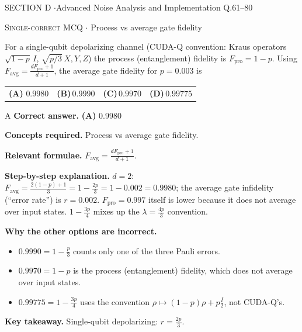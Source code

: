 \documentclass[11pt,a4paper]{article}
\newcommand{\optlabel}[1]{\textbf{(#1)}}
\newcommand{\correctlabel}[1]{\textcolor{okgreen}{\textbf{(#1)}\,\ding{51}}}
\newenvironment{qitem}[1]{\begin{list}{}{\setlength{\leftmargin}{3.3em}\setlength{\labelwidth}{3.1em}%
  \setlength{\labelsep}{0.2em}\setlength{\topsep}{3pt}\setlength{\parsep}{3pt}}\item[\textbf{Q.#1}\hfill]}{\end{list}}
\newcommand{\qsep}{\par\vspace{2pt}{\color{black!15}\hrule}\vspace{4pt}}
\newcommand{\qmeta}[2]{{\footnotesize\color{black!60}\textsc{#1} \;$\cdot$\; #2}\par}
\begin{document}
\newpage

\begin{sectionbanner}SECTION D \enspace$\cdot$\enspace Advanced Noise Analysis and Implementation \hfill Q.61--80\end{sectionbanner}

\begin{qitem}{61}
\qmeta{Single-correct MCQ}{Process vs average gate fidelity}
For a single-qubit depolarizing channel (CUDA-Q convention: Kraus operators $\sqrt{1-p}\,I$, $\sqrt{p/3}\,X, Y, Z$) the process (entanglement) fidelity is
$F_{\text{pro}} = 1 - p$. Using $F_{\text{avg}} = \frac{dF_{\text{pro}} + 1}{d + 1}$, the average gate fidelity for $p = 0.003$ is
\par\smallskip\noindent\begin{tabularx}{\linewidth}{@{}*{4}{L}@{}}
\correctlabel{A}\,$0.9980$ & \optlabel{B}\,$0.9990$ & \optlabel{C}\,$0.9970$ & \optlabel{D}\,$0.99775$
\end{tabularx}
\end{qitem}
\begin{solbox}{A}
\textbf{\color{brand}Correct answer.} \textcolor{okgreen}{\textbf{(A)}} $0.9980$

\textbf{\color{brand}Concepts required.} Process vs average gate fidelity.

\textbf{\color{brand}Relevant formulae.} $F_{\text{avg}} = \frac{dF_{\text{pro}} + 1}{d + 1}$.

\textbf{\color{brand}Step-by-step explanation.} $d = 2$: $F_{\text{avg}} = \frac{2(1 - p) + 1}{3} = 1 - \frac{2p}{3} = 1 - 0.002 = 0.9980$; the average gate infidelity (``error rate'') is $r = 0.002$.
$F_{\text{pro}} = 0.997$ itself is lower because it does not average over input states. $1 - \frac{3p}{4}$ mixes up the $\lambda = \frac{4p}{3}$ convention.

\textbf{\color{brand}Why the other options are incorrect.}
\begin{itemize}[leftmargin=2.4em, itemsep=1pt, topsep=2pt]
\item[\textbf{(B)}] $0.9990 = 1 - \frac p3$ counts only one of the three Pauli errors.
\item[\textbf{(C)}] $0.9970 = 1 - p$ is the process (entanglement) fidelity, which does not average over input states.
\item[\textbf{(D)}] $0.99775 = 1 - \frac{3p}{4}$ uses the convention $\rho \mapsto (1-p)\rho + p\frac I2$, not CUDA-Q's.
\end{itemize}
\textbf{\color{brand}Key takeaway.} Single-qubit depolarizing: $r = \frac{2p}{3}$.
\end{solbox}
\qsep
\end{document}
